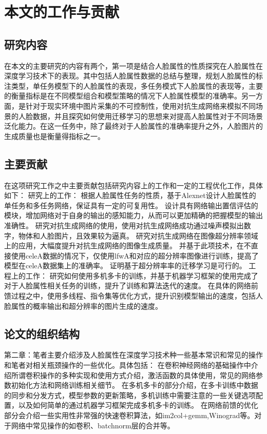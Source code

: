 \section{本文的工作与贡献}
\subsection{研究内容}
在本文的主要研究的内容有两个，第一项是结合人脸属性的性质探究在人脸属性在深度学习技术下的表现。其中包括人脸属性数据的总结与整理，规划人脸属性的标注类型，单任务模型下的人脸属性的表现，多任务模式下人脸属性的表现等，主要的衡量指标是在不同模型组合和模型策略的情况下人脸属性模型的准确率。另一方面，是针对于现实环境中图片采集的不可控制性，使用对抗生成网络来模拟不同场景的人脸数据，并且探究如何使用迁移学习的思想来对提高人脸属性对于不同场景泛化能力。在这一任务中，除了最终对于人脸属性的准确率提升之外，人脸图片的生成质量也是衡量得指标之一。
\subsection{主要贡献}
在这项研究工作之中主要贡献包括研究内容上的工作和一定的工程优化工作，具体如下：
研究上的工作：
根据人脸属性任务的性质，基于Alexnet\cite{ALEXNET}设计人脸属性的单任务和多任务网络，保证具有一定的可复用性。
设计具有网络输出置信评估的模块，增加网络对于自身的输出的感知能力，从而可以更加精确的把握模型的输出准确性。
研究对抗生成网络的使用，使用对抗生成网络成功通过噪声模拟出数字，物体和人脸图片，且效果较为逼真。
研究对抗生成网络在图像超分辨率领域上的应用，大幅度提升对抗生成网络的图像生成质量。
并基于此项技术，在不直接使用celeA数据的情况下，仅使用lfwA和对应的超分辨率图像进行训练，提高了模型在celeA数据集上的准确率。
证明基于超分辨率率的迁移学习是可行的。
工程上的工作：
研究如何使用多机多卡的训练，并基于机器学习框架的使用完成了对于人脸属性相关任务的训练，提升了训练和算法迭代的速度。
在具体的网络前馈过程之中，使用多线程、指令集等优化方式，提升识别模型输出的速度，包括人脸属性的概率输出和超分辨率的图片生成的速度。
\subsection{论文的组织结构}
第二章：笔者主要介绍涉及人脸属性在深度学习技术种一些基本常识和常见的操作和笔者对相关瓶颈操作的一些优化。具体包括：
在卷积神经网络的基础操作中介绍所谓卷积操作的多种实现和使用方式介绍，激活函数的具体使用，常见的网络参数初始化方法和网络训练相关细节。
在多机多卡的部分介绍，在多卡训练中数据的同步和分发方式，模型参数的更新策略，多机训练中需要注意的一些关键选项配置，以及如何简单的通过机器学习框架完成多机多卡的训练。
在网络前馈的优化部分会介绍一些实用性非常强的快速卷积算法，如im2col+gemm,Winograd等。对于网络中常见操作的如卷积、batchnorm层的合并等。

